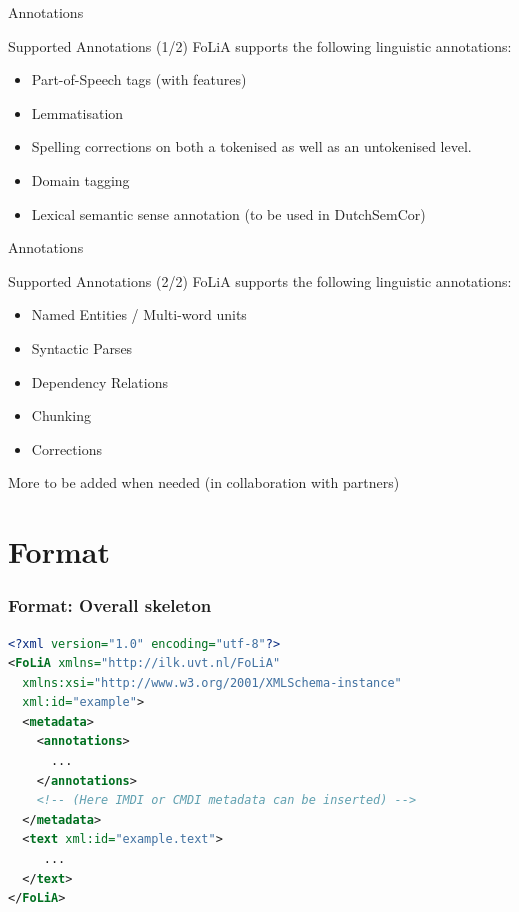 \documentclass[compress]{beamer}
\begin{document}
\begin{frame}{Annotations}
    \begin{block}{Supported Annotations (1/2)}
        FoLiA supports the following linguistic annotations:
        \begin{itemize}
            \item Part-of-Speech tags (with features)
            \item Lemmatisation
            \item Spelling corrections on both a tokenised as well as an untokenised level.
            \item Domain tagging
            \item Lexical semantic sense annotation (to be used in DutchSemCor)
        \end{itemize}
        

    \end{block}
\end{frame}
            
\begin{frame}{Annotations}
    \begin{block}{Supported Annotations (2/2)}
        FoLiA supports the following linguistic annotations:
        \begin{itemize}            
            \item Named Entities / Multi-word units
            \item Syntactic Parses
            \item Dependency Relations
            \item Chunking
            \item Corrections
        \end{itemize}
    
        More to be added when needed (in collaboration with partners)

    \end{block}
\end{frame}

\section{Format}

\begin{frame}[fragile]
\frametitle{Format: Overall skeleton}
\begin{lstlisting}[language=xml]
<?xml version="1.0" encoding="utf-8"?>
<FoLiA xmlns="http://ilk.uvt.nl/FoLiA"
  xmlns:xsi="http://www.w3.org/2001/XMLSchema-instance"
  xml:id="example">
  <metadata>    
    <annotations>
      ...
    </annotations>    
    <!-- (Here IMDI or CMDI metadata can be inserted) -->
  </metadata>
  <text xml:id="example.text">
     ...
  </text>
</FoLiA>  
\end{lstlisting}
\end{frame}
\end{document}
